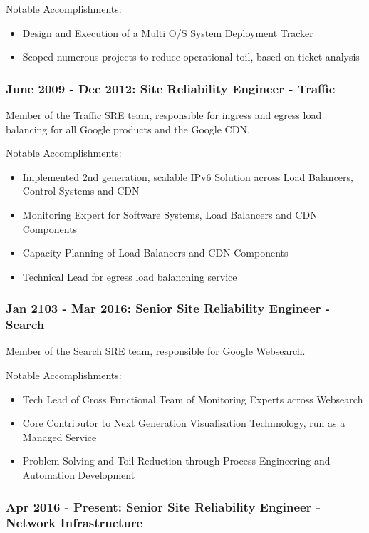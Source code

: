 \documentclass[a4paper, 11pt] {article}
\begin{document}
Notable Accomplishments:

\begin{itemize}
  \item Design and Execution of a Multi O/S System Deployment Tracker
  \item Scoped numerous projects to reduce operational toil, based on ticket analysis
\end{itemize}

\subsubsection*{June 2009 - Dec 2012: Site Reliability Engineer - Traffic}

Member of the Traffic SRE team, responsible for ingress and egress load balancing for all Google products and the Google CDN.

Notable Accomplishments:

\begin{itemize}
  \item Implemented 2nd generation, scalable IPv6 Solution across Load Balancers, Control Systems and CDN
  \item Monitoring Expert for Software Systems, Load Balancers and CDN Components 
  \item Capacity Planning of Load Balancers and CDN Components
  \item Technical Lead for egress load balancning service
\end{itemize}

\subsubsection*{Jan 2103 - Mar 2016: Senior Site Reliability Engineer - Search}

Member of the Search SRE team, responsible for Google Websearch.

Notable Accomplishments:

\begin{itemize}
  \item Tech Lead of Cross Functional Team of Monitoring Experts across Websearch
  \item Core Contributor to Next Generation Visualisation Technnology, run as a Managed Service
  \item Problem Solving and Toil Reduction through Process Engineering and Automation Development
\end{itemize}

\subsubsection*{Apr 2016 - Present: Senior Site Reliability Engineer - Network Infrastructure}
\end{document}

